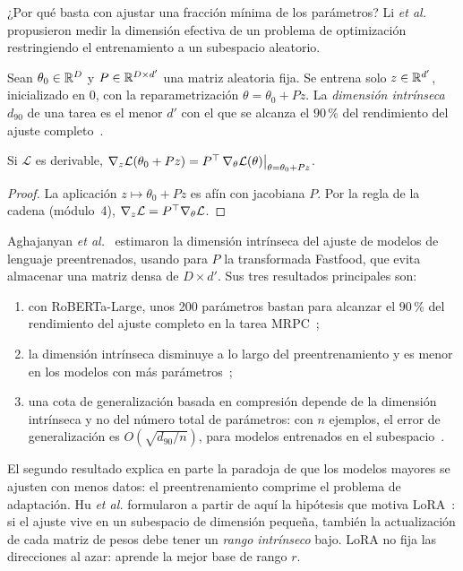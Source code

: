 ¿Por qué basta con ajustar una fracción mínima de los parámetros? Li \emph{et al.}~\cite{li-intrinsic} propusieron medir la dimensión efectiva de un problema de optimización restringiendo el entrenamiento a un subespacio aleatorio.

\begin{definicion}\label{def:intrinseca}
Sean $\theta_0\in\mathbb{R}^{D}$ y $P\in\mathbb{R}^{D\times d'}$ una matriz aleatoria fija. Se entrena solo $z\in\mathbb{R}^{d'}$, inicializado en $0$, con la reparametrización $\theta=\theta_0+Pz$. La \emph{dimensión intrínseca} $d_{90}$ de una tarea es el menor $d'$ con el que se alcanza el $90\,\%$ del rendimiento del ajuste completo~\cite[§3]{aghajanyan}.
\end{definicion}

\begin{proposicion}\label{prop:grad-subespacio}
Si $\mathcal{L}$ es derivable, $\nabla_z\mathcal{L}(\theta_0+Pz)=P^{\top}\,\nabla_\theta\mathcal{L}(\theta)\big|_{\theta=\theta_0+Pz}$.
\end{proposicion}

\begin{proof}
La aplicación $z\mapsto\theta_0+Pz$ es afín con jacobiana $P$. Por la regla de la cadena (módulo~4), $\nabla_z\mathcal{L}=P^{\top}\nabla_\theta\mathcal{L}$.
\end{proof}

Aghajanyan \emph{et al.}~\cite{aghajanyan} estimaron la dimensión intrínseca del ajuste de modelos de lenguaje preentrenados, usando para $P$ la transformada Fastfood, que evita almacenar una matriz densa de $D\times d'$. Sus tres resultados principales son:
\begin{enumerate}
  \item con RoBERTa-Large, unos 200 parámetros bastan para alcanzar el $90\,\%$ del rendimiento del ajuste completo en la tarea MRPC~\cite[§4.2]{aghajanyan};
  \item la dimensión intrínseca disminuye a lo largo del preentrenamiento y es menor en los modelos con más parámetros~\cite[§5.1 y~§5.2]{aghajanyan};
  \item una cota de generalización basada en compresión depende de la dimensión intrínseca y no del número total de parámetros: con $n$ ejemplos, el error de generalización es $O(\sqrt{d_{90}/n})$, para modelos entrenados en el subespacio~\cite[§5.3]{aghajanyan}.
\end{enumerate}

\begin{observacion}
El segundo resultado explica en parte la paradoja de que los modelos mayores se ajusten con menos datos: el preentrenamiento comprime el problema de adaptación. Hu \emph{et al.} formularon a partir de aquí la hipótesis que motiva LoRA~\cite[§1 y~§4.1]{hu-lora}: si el ajuste vive en un subespacio de dimensión pequeña, también la actualización de cada matriz de pesos debe tener un \emph{rango intrínseco} bajo. LoRA no fija las direcciones al azar: aprende la mejor base de rango $r$.
\end{observacion}

